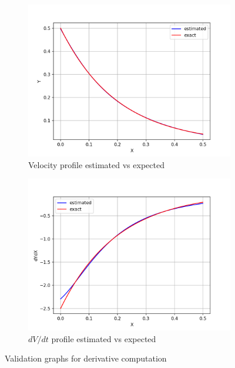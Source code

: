 \begin{figure}
    \begin{subfigure}{0.5\linewidth}
       \center
        \includegraphics[scale=0.5]{supportingFiles/02_results/03_derivative_validation/estimation.png}
        \caption{Velocity profile estimated vs expected}
        \label{validation_decay_profile}
    \end{subfigure}
    \hfill
    \begin{subfigure}{0.5\linewidth}
       \center
        \includegraphics[scale=0.5]{supportingFiles/02_results/03_derivative_validation/derivative.png}
        \caption{\(dV/dt\) profile estimated vs expected}
        \label{validation_derivative_profile}
    \end{subfigure}
    \hfill
    \caption{Validation graphs for derivative computation}
\end{figure}

